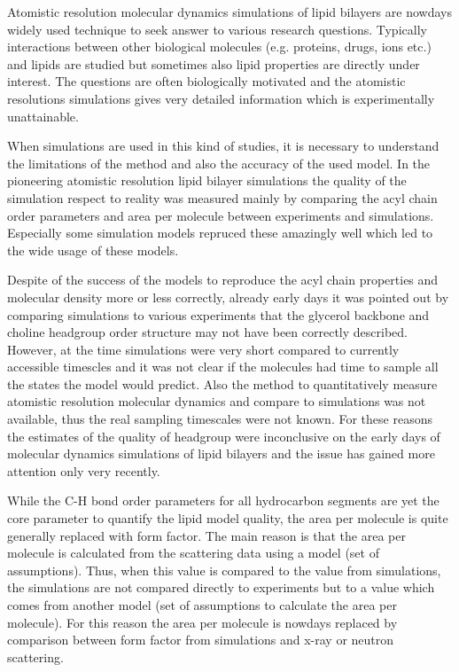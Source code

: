 \documentclass[aps,prl,superscriptaddress,twocolumn]{revtex4}
\begin{document}
Atomistic resolution molecular dynamics simulations of lipid bilayers are nowdays
widely used technique to seek answer to various research questions.
Typically interactions between other biological molecules (e.g. proteins, drugs, ions etc.)
and lipids are studied but sometimes also lipid properties are directly under interest.
The questions are often biologically motivated and the atomistic resolutions simulations
gives very detailed information which is experimentally unattainable.

When simulations are used in this kind of studies, it is necessary to understand
the limitations of the method and also the accuracy of the used model.
In the pioneering atomistic resolution lipid bilayer simulations the quality of
the simulation respect to reality was measured mainly by comparing the 
acyl chain order parameters and area per molecule between experiments and
simulations. Especially some simulation models repruced these amazingly well
which led to the wide usage of these models.

Despite of the success of the models to reproduce the acyl chain properties and
molecular density more or less correctly, already early days it was pointed out
by comparing simulations to various experiments
that the glycerol backbone and choline headgroup order structure may not have been 
correctly described. However, at the time simulations were very short compared
to currently accessible timescles and it was not clear if the molecules had
time to sample all the states the model would predict. Also the method to 
quantitatively measure atomistic resolution molecular dynamics and compare to
simulations was not available, thus the real sampling timescales were not known.
For these reasons the estimates of the quality of headgroup were inconclusive on
the early days of molecular dynamics simulations of lipid bilayers and
the issue has gained more attention only very recently.

While the C-H bond order parameters for all hydrocarbon segments are yet the
core parameter to quantify the lipid model quality, the area per molecule 
is quite generally replaced with form factor.
The main reason is that the area per molecule is calculated from the scattering
data using a model (set of assumptions). Thus, when this value is compared to
the value from simulations, the simulations are not compared directly to experiments
but to a value which comes from another model (set of assumptions to calculate the
area per molecule). For this reason the area per molecule is nowdays replaced
by comparison between form factor from simulations and x-ray or neutron scattering.
\end{document}
